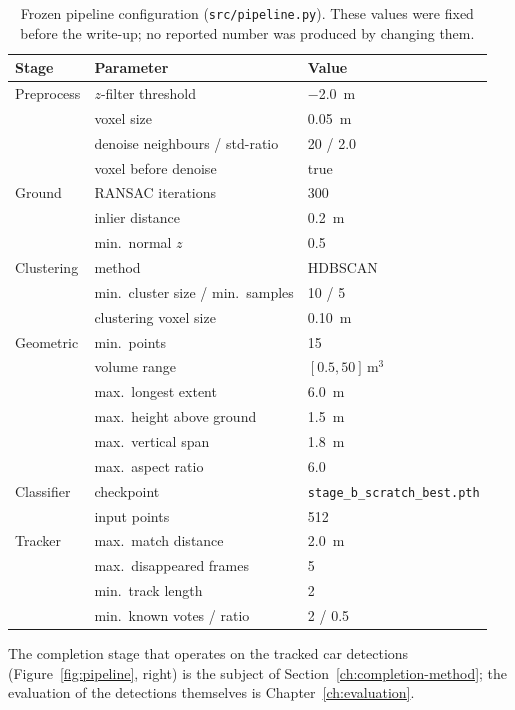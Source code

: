 \begin{table}[H]
  \centering
  \caption{Frozen pipeline configuration (\texttt{src/pipeline.py}). These values
    were fixed before the write-up; no reported number was produced by changing
    them.}
  \label{tab:pipeline-config}
  \begin{tabular}{lll}
    \toprule
    Stage & Parameter & Value \\
    \midrule
    Preprocess & $z$-filter threshold & \SI{-2.0}{\meter} \\
               & voxel size & \SI{0.05}{\meter} \\
               & denoise neighbours / std-ratio & \num{20} / \num{2.0} \\
               & voxel before denoise & true \\
    \midrule
    Ground     & RANSAC iterations & \num{300} \\
               & inlier distance & \SI{0.2}{\meter} \\
               & min.\ normal $z$ & \num{0.5} \\
    \midrule
    Clustering & method & HDBSCAN \\
               & min.\ cluster size / min.\ samples & \num{10} / \num{5} \\
               & clustering voxel size & \SI{0.10}{\meter} \\
    \midrule
    Geometric  & min.\ points & \num{15} \\
               & volume range & $[\num{0.5}, \num{50}]\,\si{\meter\cubed}$ \\
               & max.\ longest extent & \SI{6.0}{\meter} \\
               & max.\ height above ground & \SI{1.5}{\meter} \\
               & max.\ vertical span & \SI{1.8}{\meter} \\
               & max.\ aspect ratio & \num{6.0} \\
    \midrule
    Classifier & checkpoint & \texttt{stage\_b\_scratch\_best.pth} \\
               & input points & \num{512} \\
    \midrule
    Tracker    & max.\ match distance & \SI{2.0}{\meter} \\
               & max.\ disappeared frames & \num{5} \\
               & min.\ track length & \num{2} \\
               & min.\ known votes / ratio & \num{2} / \num{0.5} \\
    \bottomrule
  \end{tabular}
\end{table}

The completion stage that operates on the tracked car detections
(Figure~\ref{fig:pipeline}, right) is the subject of Section~\ref{ch:completion-method}; the evaluation of
the detections themselves is Chapter~\ref{ch:evaluation}.
